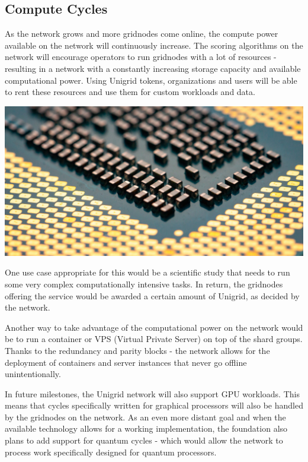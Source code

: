 \documentclass[a4paper,oneside]{article}
\begin{document}
\subsection{Compute Cycles}
As the network grows and more gridnodes come online, the compute power available on the network will continuously increase. The scoring algorithms on the network will encourage operators to run gridnodes with a lot of resources - resulting in a network with a constantly increasing storage capacity and available computational power. Using Unigrid tokens, organizations and users will be able to rent these resources and use them for custom workloads and data.

\vspace{0.12cm}
\begin{mdframed}[style=textimage]
	\includegraphics[width=381pt]{compute}
\end{mdframed}

\noindent One use case appropriate for this would be a scientific study that needs to run some very complex computationally intensive tasks. In return, the gridnodes offering the service would be awarded a certain amount of Unigrid, as decided by the network. 

Another way to take advantage of the computational power on the network would be to run a container or VPS (Virtual Private Server) on top of the shard groups. Thanks to the redundancy and parity blocks - the network allows for the deployment of containers and server instances that never go offline unintentionally.

In future milestones, the Unigrid network will also support GPU workloads. This means that cycles specifically written for graphical processors will also be handled by the gridnodes on the network. As an even more distant goal and when the available technology allows for a working implementation, the foundation also plans to add support for quantum cycles - which would allow the network to process work specifically designed for quantum processors.
\end{document}

